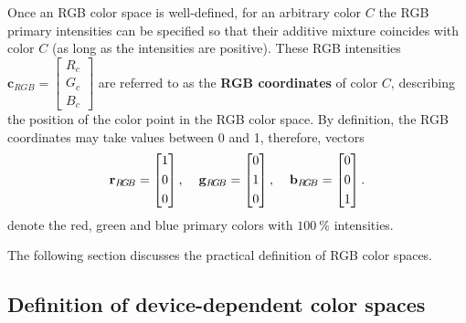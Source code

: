 \vspace{3mm}
Once an RGB color space is well-defined, for an arbitrary color $C$ the RGB primary intensities can be specified so that their additive mixture coincides with color $C$ (as long as the intensities are positive).
These RGB intensities $\mathbf{c}_{RGB} = \begin{bmatrix}
       R_c \\[0.3em] G_c \\[0.3em] B_c \end{bmatrix}$  are referred to as the \textbf{RGB coordinates} of color $C$, describing the position of the color point in the RGB color space.
By definition, the RGB coordinates may take values between 0 and 1, therefore, vectors
\begin{equation}
\mathbf{r}_{R\!G\!B} = \begin{bmatrix}
       1 \\[0.3em]
       0 \\[0.3em]
       0 \end{bmatrix}, \hspace{4mm}
\mathbf{g}_{R\!G\!B} = \begin{bmatrix}
       0 \\[0.3em]
       1 \\[0.3em]
       0 \end{bmatrix}, \hspace{4mm}
\mathbf{b}_{R\!G\!B} = \begin{bmatrix}
       0 \\[0.3em]
       0 \\[0.3em]
       1 \end{bmatrix}.
\end{equation}
denote the red, green and blue primary colors with $100~\%$ intensities.

The following section discusses the practical definition of RGB color spaces.

\subsection{Definition of device-dependent color spaces}

